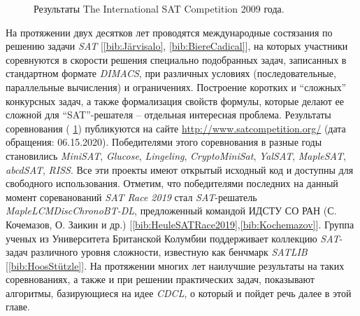 \begin{figure}[h]
\centering
\captionsetup{justification=centering}
\caption{Результаты The International SAT Competition 2009 года.}
\label{chapter1:fig:satcomp}
\end{figure}

На протяжении двух десятков лет проводятся международные состязания по решению задачи \textit{SAT} 
[\ref{bib:Järvisalo}, \ref{bib:BiereCadical}], на которых участники соревнуются в скорости решения специально подобранных задач, записанных в стандартном формате \textit{DIMACS}, при различных условиях (последовательные, параллельные вычисления) и ограничениях. Построение коротких и \enquote{сложных} конкурсных задач, а также формализация свойств формулы, которые делают ее сложной для \enquote{SAT}-решателя -- отдельная интересная проблема. Результаты соревнования 
(\figurename{ \ref{chapter1:fig:satcomp}}) публикуются на сайте \url{http://www.satcompetition.org/} (дата обращения: 06.15.2020). Победителями этого соревнования в разные годы становились \textit{MiniSAT}, \textit{Glucose}, \textit{Lingeling}, \textit{CryptoMiniSat}, \textit{YalSAT}, \textit{MapleSAT}, \textit{abcdSAT}, \textit{RISS}. Все эти проекты имеют открытый исходный код и доступны для свободного использования. Отметим, что победителями последних на данный момент сореванований \textit{SAT Race 2019} стал \textit{SAT}-решатель \textit{MapleLCMDiscChronoBT-DL}, предложенный
командой ИДСТУ СО РАН (С. Кочемазов, О. Заикин и др.) [\ref{bib:HeuleSATRace2019},\ref{bib:Kochemazov}]. 
Группа ученых из Университета Британской Колумбии поддерживает коллекцию \textit{SAT}-задач различного уровня сложности, известную как бенчмарк \textit{SATLIB} 
[\ref{bib:HoosStützle}]. На протяжении многих лет наилучшие результаты на таких соревнованиях, а также и при решении практических задач, показывают алгоритмы, базирующиеся на идее \textit{CDCL}, о который и пойдет речь далее в этой главе.

